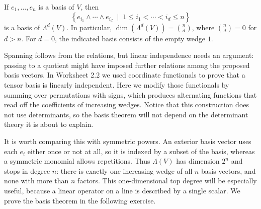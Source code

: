 \documentclass[12pt,reqno]{amsart}
\begin{document}
\begin{theorem}
If $e_1,\ldots,e_n$ is a basis of $V$, then
\[
\left\{e_{i_1}\wedge\cdots\wedge e_{i_d} \;\; \big| \;\; 1\leq i_1<\cdots<i_d\leq n\right\}
\]
is a basis of $\Lambda^d(V)$. In particular, $\dim(\Lambda^d(V))=\binom{n}{d}$, where $\binom{n}{d}=0$ for $d>n$. For $d=0$, the indicated basis consists of the empty wedge $1$.
\end{theorem}

Spanning follows from the relations, but linear independence needs an argument: passing to a quotient might have imposed further relations among the proposed basis vectors. In Worksheet 2.2 we used coordinate functionals to prove that a tensor basis is linearly independent. Here we modify those functionals by summing over permutations with signs, which produces alternating functions that read off the coefficients of increasing wedges. Notice that this construction does not use determinants, so the basis theorem will not depend on the determinant theory it is about to explain.

It is worth comparing this with symmetric powers. An exterior basis vector uses each $e_i$ either once or not at all, so it is indexed by a subset of the basis, whereas a symmetric monomial allows repetitions. Thus $\Lambda(V)$ has dimension $2^n$ and stops in degree $n$: there is exactly one increasing wedge of all $n$ basis vectors, and none with more than $n$ factors. This one-dimensional top degree will be especially useful, because a linear operator on a line is described by a single scalar. We prove the basis theorem in the following exercise.

\hrulefill
\end{document}
